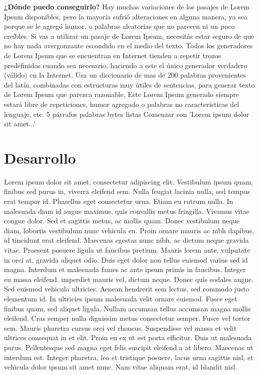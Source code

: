 \documentclass[letterpaper, 12pt]{article}
\begin{document}
    \textbf{¿Dónde puedo conseguirlo?}
    Hay muchas variaciones de los pasajes de Lorem Ipsum disponibles, pero la mayoría sufrió alteraciones en alguna manera, 
    ya sea porque se le agregó humor, o palabras aleatorias que no parecen ni un poco creíbles. Si vas a utilizar un pasaje 
    de Lorem Ipsum, necesitás estar seguro de que no hay nada avergonzante escondido en el medio del texto. Todos los generadores 
    de Lorem Ipsum que se encuentran en Internet tienden a repetir trozos predefinidos cuando sea necesario, haciendo a este 
    el único generador verdadero (válido) en la Internet. Usa un diccionario de mas de 200 palabras provenientes del latín, 
    combinadas con estructuras muy útiles de sentencias, para generar texto de Lorem Ipsum que parezca razonable. 
    Este Lorem Ipsum generado siempre estará libre de repeticiones, humor agregado o palabras no características del lenguaje, etc.
    5 párrafos palabras bytes listas Comenzar con 'Lorem ipsum dolor sit amet...'

    \section{Desarrollo}
    Lorem ipsum dolor sit amet, consectetur adipiscing elit. Vestibulum ipsum quam, finibus sed purus in, viverra eleifend sem. 
    Nulla feugiat lacinia nulla, sed tempus erat tempor id. Phasellus eget consectetur urna. Etiam eu rutrum nulla. In malesuada 
    diam id augue maximus, quis convallis metus fringilla. Vivamus vitae congue dolor. Sed et sagittis metus, ac mollis quam. 
    Donec vestibulum neque diam, lobortis vestibulum nunc vehicula eu. Proin ornare mauris ac nibh dapibus, id tincidunt erat 
    eleifend. Maecenas egestas nunc nibh, ac dictum neque gravida vitae. Praesent posuere ligula ut faucibus pretium. Mauris lorem 
    ante, vulputate in orci at, gravida aliquet odio. Duis eget dolor non tellus euismod varius sed id magna. Interdum et malesuada 
    fames ac ante ipsum primis in faucibus. Integer eu massa eleifend, imperdiet mauris vel, dictum neque.
    Donec quis sodales augue. Sed euismod vehicula ultricies. Aenean hendrerit sem lectus, sed commodo justo elementum id. 
    In ultricies ipsum malesuada velit ornare euismod. Fusce eget finibus quam, sed aliquet ligula. Nullam accumsan tellus accumsan 
    magna mollis eleifend. Cras semper nulla dignissim metus consectetur semper. Fusce vel tortor sem. Mauris pharetra cursus orci 
    vel rhoncus. Suspendisse vel massa et velit ultrices consequat in et elit. Proin eu ex ut est porta efficitur. Duis ut malesuada 
    purus. Pellentesque sed magna eget felis suscipit eleifend a at libero. Maecenas ut interdum est. Integer pharetra, leo et 
    tristique posuere, lacus urna sagittis nisl, et vehicula dolor ipsum sit amet nunc. Nam vitae aliquam erat, id blandit nisl.
\end{document}
